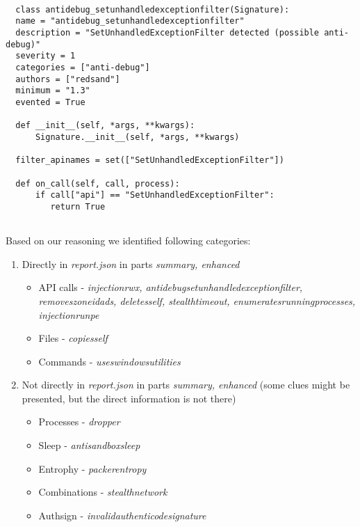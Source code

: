 \begin{lstlisting}[language=mypython, caption={Example of signature implementation},captionpos=b, label={lst:signatureimpl}]
  
  class antidebug_setunhandledexceptionfilter(Signature):
  name = "antidebug_setunhandledexceptionfilter"
  description = "SetUnhandledExceptionFilter detected (possible anti-debug)"
  severity = 1
  categories = ["anti-debug"]
  authors = ["redsand"]
  minimum = "1.3"
  evented = True

  def __init__(self, *args, **kwargs):
      Signature.__init__(self, *args, **kwargs)

  filter_apinames = set(["SetUnhandledExceptionFilter"])

  def on_call(self, call, process):
      if call["api"] == "SetUnhandledExceptionFilter":
         return True
  
\end{lstlisting}


Based on our reasoning we identified following categories:

\begin{enumerate}
  \item Directly in \emph{report.json} in parts \emph{summary, enhanced}
  \begin{itemize}
    \item API calls - \emph{injectionrwx, antidebugsetunhandledexceptionfilter, removeszoneidads, deletesself, stealthtimeout, enumeratesrunningprocesses, injectionrunpe}
    \item Files - \emph{copiesself}
    \item Commands - \emph{useswindowsutilities}
  \end{itemize}
  \item Not directly in \emph{report.json} in parts \emph{summary, enhanced} (some clues might be presented, but the direct information is not there)
  \begin{itemize}
    \item Processes - \emph{dropper}
    \item Sleep - \emph{ antisandboxsleep}
    \item Entrophy - \emph{packerentropy}
    \item Combinations - \emph{stealthnetwork}
    \item Authsign - \emph{invalidauthenticodesignature}
  \end{itemize}
\end{enumerate}

